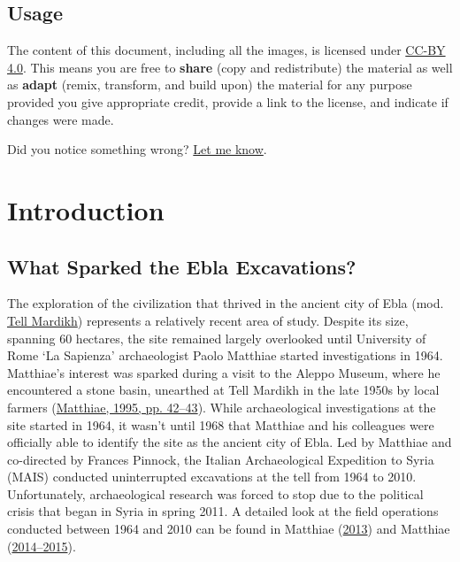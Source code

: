 \documentclass[
]{book}
\begin{document}
\hypertarget{usage}{%
\section*{Usage}\label{usage}}

The content of this document, including all the images, is licensed under \href{https://creativecommons.org/licenses/by-sa/4.0/}{CC-BY 4.0}. This means you are free to \textbf{share} (copy and redistribute) the material as well as \textbf{adapt} (remix, transform, and build upon) the material for any purpose provided you give appropriate credit, provide a link to the license, and indicate if changes were made.

Did you notice something wrong? \href{mailto:erica.scarpa@cnr.it}{Let me know}.

\hypertarget{introduction}{%
\chapter{Introduction}\label{introduction}}

\hypertarget{what-sparked-the-ebla-excavations}{%
\section{What Sparked the Ebla Excavations?}\label{what-sparked-the-ebla-excavations}}

The exploration of the civilization that thrived in the ancient city of Ebla (mod. \href{https://pleiades.stoa.org/places/869702586}{Tell Mardikh}) represents a relatively recent area of study. Despite its size, spanning 60 hectares, the site remained largely overlooked until University of Rome `La Sapienza' archaeologist Paolo Matthiae started investigations in 1964. Matthiae's interest was sparked during a visit to the Aleppo Museum, where he encountered a stone basin, unearthed at Tell Mardikh in the late 1950s by local farmers (\protect\hyperlink{ref-Matthiae1995a}{Matthiae, 1995, pp. 42--43}). While archaeological investigations at the site started in 1964, it wasn't until 1968 that Matthiae and his colleagues were officially able to identify the site as the ancient city of Ebla.
Led by Matthiae and co-directed by Frances Pinnock, the Italian Archaeological Expedition to Syria (MAIS) conducted uninterrupted excavations at the tell from 1964 to 2010. Unfortunately, archaeological research was forced to stop due to the political crisis that began in Syria in spring 2011. A detailed look at the field operations conducted between 1964 and 2010 can be found in Matthiae (\protect\hyperlink{ref-Matthiae2013d}{2013}) and Matthiae (\protect\hyperlink{ref-Matthiae2014d}{2014--2015}).
\end{document}
